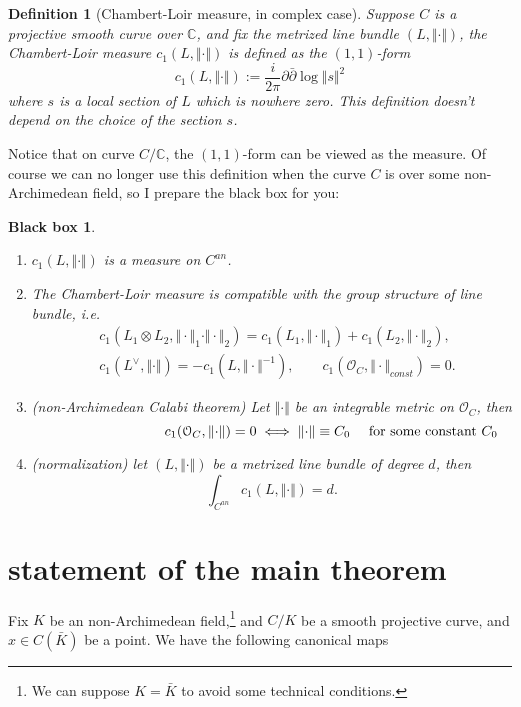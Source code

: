 \documentclass[reqno,11pt]{amsart}
\numberwithin{equation}{section}
\theoremstyle{plain}
\newtheorem{defn}[theorem]{Definition}
\newtheorem*{bbox}{Black box}
\theoremstyle{plain}
\numberwithin{equation}{section}
\theoremstyle{remark}
\newcommand{\norm}[1]{\Vert{#1}\Vert}
\begin{document}
\begin{defn}[Chambert-Loir measure, in complex case]
Suppose $C$ is a projective smooth curve over $\mathbb{C}$, and fix the metrized line bundle $(L,\norm{\cdot})$, the Chambert-Loir measure $c_1(L,\norm{\cdot})$ is defined as the $(1,1)$-form
$$c_1(L,\norm{\cdot}):= \frac{i}{2\pi}\partial\bar{\partial} \log \norm{s}^2$$
where $s$ is a local section of $L$ which is nowhere zero.  This definition doesn't depend on the choice of the section $s$.
\end{defn}
Notice that on curve $C/\mathbb{C}$, the $(1,1)$-form can be viewed as the measure. Of course we can no longer use this definition when the curve $C$ is over some non-Archimedean field, so I prepare the black box for you:
\begin{bbox}\
\begin{enumerate}[(1)]
\item $c_1(L,\norm{\cdot})$ is a measure on $C^{an}$.
\item The Chambert-Loir measure is compatible with the group structure of line bundle, i.e.
\begin{equation*}
\begin{aligned}
  &c_1(L_1\otimes L_2,\norm{\cdot}_1\cdot \norm{\cdot}_2)=c_1(L_1,\norm{\cdot}_1)+c_1(L_2,\norm{\cdot}_2),  \\
   &c_1(L^{\vee},\norm{\cdot})=-c_1(L,\norm{\cdot}^{-1}),\quad\quad c_1(\mathcal{O}_C,\norm{\cdot}_{const})=0.
\end{aligned}
\end{equation*}
\item (non-Archimedean Calabi theorem) Let $\norm{\cdot}$ be an integrable metric on $\mathcal{O}_C$, then
$$c_1(\mathcal{O}_C,\norm{\cdot})=0 \iff \norm{\cdot} \equiv C_0 \quad \text{ for some constant $C_0$}\hspace{-3cm}$$
\item (normalization) let $(L,\norm{\cdot})$ be a metrized line bundle of degree $d$, then
$$\int_{C^{an}} c_1(L,\norm{\cdot})=d.$$
\end{enumerate}
\end{bbox}
\section{statement of the main theorem}
Fix $K$ be an non-Archimedean field,\footnote{We can suppose $K=\bar{K}$ to avoid some technical conditions.} and $C/K$ be a smooth projective curve, and $x\in C(\bar{K})$ be a point. We have the following canonical maps
\end{document}

